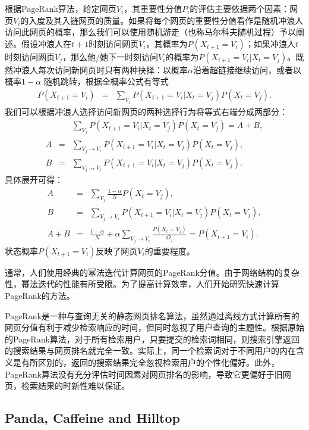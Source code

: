 根据PageRank算法，给定网页$V_i$，其重要性分值$P_i$的评估主要依据两个因素：网页$V_i$的入度及其入链网页的质量。如果将每个网页的重要性分值看作是随机冲浪人访问此网页的概率，那么我们可以使用随机游走（也称马尔科夫随机过程）予以阐述。假设冲浪人在$t+1$时刻访问网页$V_i$，其概率为$P(X_{t+1}=V_i)$；如果冲浪人$t$ 时刻访问网页$V_j$，那么他/她下一时刻访问$V_i$的概率为$P(X_{t+1}=V_i|X_t=V_j)$。既然冲浪人每次访问新网页时只有两种抉择：以概率$\alpha$沿着超链接继续访问，或者以概率$1-\alpha$ 随机跳转，根据全概率公式有等式
\begin{eqnarray}
   P(X_{t+1} = V_i) & = & \sum\limits_{V_j} P(X_{t+1}=V_i|X_t=V_j) P(X_t = V_j).
\end{eqnarray}
我们可以根据冲浪人选择访问新网页的两种选择行为将等式右端分成两部分：
\begin{eqnarray}
    & & \sum\limits_{V_j} P(X_{t+1}=V_i|X_t=V_j) P(X_t = V_j) = A + B,\\
    A & = & \sum\limits_{V_j\rightarrow V_i} P(X_{t+1}=V_i|X_t=V_j) P(X_t = V_j),\\
    B & = & \sum\limits_{V_j\nrightarrow V_i} P(X_{t+1}=V_i|X_t=V_j) P(X_t = V_j).
\end{eqnarray}
具体展开可得：
\begin{eqnarray}
   A & = & \sum\limits_{V_j} \frac{1-\alpha}{N} P(X_t = V_j), \\
   B & = & \sum\limits_{V_j\rightarrow V_i} P(X_{t+1}=V_i|X_t=V_j)P(X_t = V_j),\\
   A + B & = & \frac{1-\alpha}{N} + \alpha \sum\limits_{V_j\rightarrow V_i} \frac{P(X_t = V_j)}{O_j} = P(X_{t+1} = V_i).
\end{eqnarray}
状态概率$P(X_{t+1}=V_i)$反映了网页$V_i$的重要程度。

通常，人们使用经典的幂法迭代计算网页的PageRank分值。由于网络结构的复杂性，幂法迭代的性能有所受限。为了提高计算效率，人们开始研究快速计算PageRank的方法。

PageRank是一种与查询无关的静态网页排名算法，虽然通过离线方式计算所有的网页分值有利于减少检索响应的时间，但同时忽视了用户查询的主题性。根据原始的PageRank算法，对于所有检索用户，只要提交的检索词相同，则搜索引擎返回的搜索结果与网页排名就完全一致。实际上，同一个检索词对于不同用户的内在含义是有所区别的，返回的搜索结果完全忽视检索用户的个性化偏好。此外，PageRank算法没有充分评估时间因素对网页排名的影响，导致它更偏好于旧网页，检索结果的时新性难以保证。

\subsection{Panda, Caffeine and Hilltop}

